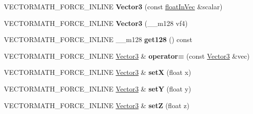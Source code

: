 \begin{DoxyCompactItemize}
\item 
\mbox{\label{classVectormath_1_1Aos_1_1Vector3_a417c78c1d67cbdb9a1d25b491b869363}} 
V\+E\+C\+T\+O\+R\+M\+A\+T\+H\+\_\+\+F\+O\+R\+C\+E\+\_\+\+I\+N\+L\+I\+NE {\bfseries Vector3} (const \hyperlink{classVectormath_1_1floatInVec}{float\+In\+Vec} \&scalar)
\item 
\mbox{\label{classVectormath_1_1Aos_1_1Vector3_a2e444557932c1115952cc60231913e7e}} 
V\+E\+C\+T\+O\+R\+M\+A\+T\+H\+\_\+\+F\+O\+R\+C\+E\+\_\+\+I\+N\+L\+I\+NE {\bfseries Vector3} (\+\_\+\+\_\+m128 vf4)
\item 
\mbox{\label{classVectormath_1_1Aos_1_1Vector3_a29b89eaceee70af54de157f76b104891}} 
V\+E\+C\+T\+O\+R\+M\+A\+T\+H\+\_\+\+F\+O\+R\+C\+E\+\_\+\+I\+N\+L\+I\+NE \+\_\+\+\_\+m128 {\bfseries get128} () const
\item 
\mbox{\label{classVectormath_1_1Aos_1_1Vector3_adeff486f351f2d8b5df32418700d7889}} 
V\+E\+C\+T\+O\+R\+M\+A\+T\+H\+\_\+\+F\+O\+R\+C\+E\+\_\+\+I\+N\+L\+I\+NE \hyperlink{classVectormath_1_1Aos_1_1Vector3}{Vector3} \& {\bfseries operator=} (const \hyperlink{classVectormath_1_1Aos_1_1Vector3}{Vector3} \&vec)
\item 
\mbox{\label{classVectormath_1_1Aos_1_1Vector3_ae4d2df8936f102299b5973bfca738455}} 
V\+E\+C\+T\+O\+R\+M\+A\+T\+H\+\_\+\+F\+O\+R\+C\+E\+\_\+\+I\+N\+L\+I\+NE \hyperlink{classVectormath_1_1Aos_1_1Vector3}{Vector3} \& {\bfseries setX} (float x)
\item 
\mbox{\label{classVectormath_1_1Aos_1_1Vector3_a4fb08b20326003f01cbe1a30035ee2eb}} 
V\+E\+C\+T\+O\+R\+M\+A\+T\+H\+\_\+\+F\+O\+R\+C\+E\+\_\+\+I\+N\+L\+I\+NE \hyperlink{classVectormath_1_1Aos_1_1Vector3}{Vector3} \& {\bfseries setY} (float y)
\item 
\mbox{\label{classVectormath_1_1Aos_1_1Vector3_a33e706c6d8715937610ec00d3efc4f80}} 
V\+E\+C\+T\+O\+R\+M\+A\+T\+H\+\_\+\+F\+O\+R\+C\+E\+\_\+\+I\+N\+L\+I\+NE \hyperlink{classVectormath_1_1Aos_1_1Vector3}{Vector3} \& {\bfseries setZ} (float z)
\item 

\end{DoxyCompactItemize}
